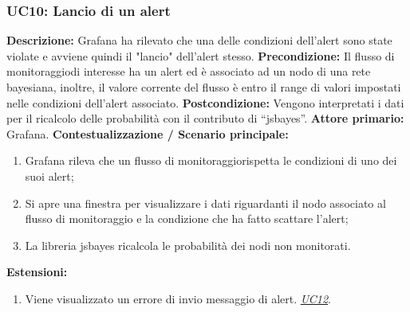 		        \subsubsection{UC10: Lancio di un alert}
                    \textbf{Descrizione:} Grafana ha rilevato che una delle condizioni dell'alert sono state violate e avviene quindi il "lancio" dell'alert stesso.
                    \newline
                    \textbf{Precondizione:} Il flusso di monitoraggio\pedice di interesse ha un alert ed è associato ad un nodo di una rete bayesiana, inoltre, il valore corrente del flusso è entro il range di valori impostati nelle condizioni dell'alert associato.
                    \newline
                    \textbf{Postcondizione:} Vengono interpretati i dati per il ricalcolo delle probabilità con il contributo di “jsbayes”.
                    \newline
                    \textbf{Attore primario:} Grafana.
                    \newline
                    \textbf{Contestualizzazione / Scenario principale:} \begin{enumerate}
                            \item Grafana rileva che un flusso di monitoraggio\pedice rispetta le condizioni di uno dei suoi alert;
                            \item Si apre una finestra per visualizzare i dati riguardanti il nodo associato al flusso di monitoraggio e la condizione che ha fatto scattare l'alert;
                            \item La libreria jsbayes ricalcola le probabilità dei nodi non monitorati.
                        \end{enumerate}
                    
                    \textbf{Estensioni:} 
                    \begin{enumerate}
                        \item Viene visualizzato un errore di invio messaggio di alert. \underline{\textit{UC12}}.
                    \end{enumerate}
                    
                      
                      
